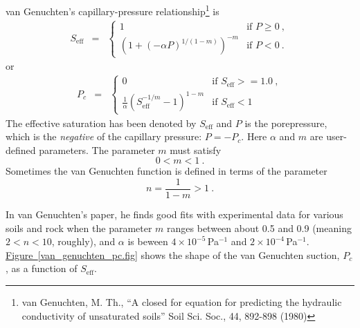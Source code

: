 \documentclass[12pt]{report}
\begin{document}
van Genuchten's capillary-pressure relationship\footnote{van
  Genuchten, M. Th., ``A closed for equation for predicting the
  hydraulic conductivity of unsaturated soils'' Soil Sci. Soc., 44,
  892-898 (1980)} is
\begin{eqnarray}
S_{\mathrm{eff}} & = & \left\{
\begin{array}{ll}
1 & \mbox{if } P \geq 0 \ , \\
(1 + (-\alpha P)^{1/(1-m)})^{-m} & \mbox{if } P < 0\ .
\label{vg.cap.eqn}
\end{array}
\right.
\end{eqnarray}
or
\begin{eqnarray}
P_{c} & = & \left\{
\begin{array}{ll}
0 & \mbox{if } S_{\mathrm{eff}} >= 1.0 \ , \\
\frac{1}{\alpha} (S_{\mathrm{eff}}^{-1/m} - 1)^{1 - m} & \mbox{if }
S_{\mathrm{eff}} < 1
\end{array}
\right.
\end{eqnarray}
The effective saturation has been denoted by $S_{\mathrm{eff}}$ and
$P$ is the porepressure, which is the {\em negative} of the capillary
pressure: $P = -P_{c}$.  Here $\alpha$ and $m$ are user-defined parameters.  The
parameter $m$ must satisfy
\begin{equation}
0 < m < 1 \ .
\end{equation}
Sometimes the van
Genuchten function is defined in terms of the parameter
\begin{equation}
n = \frac{1}{1 - m} > 1 \ .
\end{equation}

In van Genuchten's paper, he finds good fits with experimental data
for various soils and rock when the parameter $m$ ranges between about
0.5 and 0.9 (meaning $2<n<10$, roughly), and $\alpha$ is beween
$4\times 10^{-5}$\,Pa$^{-1}$ and $2\times 10^{-4}$\,Pa$^{-1}$.
\hyperref[van_genuchten_pc.fig]{Figure~\ref*{van_genuchten_pc.fig}}
shows the shape of the van Genuchten suction, $P_{c}$, as a function
of $S_{\mathrm{eff}}$.
\end{document}

